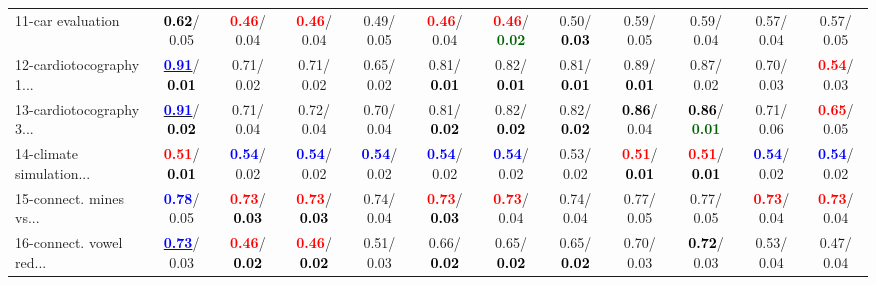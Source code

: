 \begin{table}[h]
\begin{center}
{\begin{tabular}{lc|c|c|c|c|c|c|c|c|c|c}
11-car evaluation & \textcolor{black}{\textbf{  0.62}}/  0.05 & \textcolor{red}{\textbf{  0.46}}/  0.04 & \textcolor{red}{\textbf{  0.46}}/  0.04 &   0.49/  0.05 & \textcolor{red}{\textbf{  0.46}}/  0.04 & \textcolor{red}{\textbf{  0.46}}/\textcolor{darkgreen}{\textbf{  0.02}} &   0.50/\textcolor{black}{\textbf{  0.03}} &   0.59/  0.05 &   0.59/  0.04 &   0.57/  0.04 &   0.57/  0.05 \\
12-cardiotocography 1... & \underline{\textcolor{blue}{\textbf{  0.91}}}/\textcolor{black}{\textbf{  0.01}} &   0.71/  0.02 &   0.71/  0.02 &   0.65/  0.02 &   0.81/\textcolor{black}{\textbf{  0.01}} &   0.82/\textcolor{black}{\textbf{  0.01}} &   0.81/\textcolor{black}{\textbf{  0.01}} &   0.89/\textcolor{black}{\textbf{  0.01}} &   0.87/  0.02 &   0.70/  0.03 & \textcolor{red}{\textbf{  0.54}}/  0.03 \\
13-cardiotocography 3... & \underline{\textcolor{blue}{\textbf{  0.91}}}/\textcolor{black}{\textbf{  0.02}} &   0.71/  0.04 &   0.72/  0.04 &   0.70/  0.04 &   0.81/\textcolor{black}{\textbf{  0.02}} &   0.82/\textcolor{black}{\textbf{  0.02}} &   0.82/\textcolor{black}{\textbf{  0.02}} & \textcolor{black}{\textbf{  0.86}}/  0.04 & \textcolor{black}{\textbf{  0.86}}/\textcolor{darkgreen}{\textbf{  0.01}} &   0.71/  0.06 & \textcolor{red}{\textbf{  0.65}}/  0.05 \\
14-climate simulation... & \textcolor{red}{\textbf{  0.51}}/\textcolor{black}{\textbf{  0.01}} & \textcolor{blue}{\textbf{  0.54}}/  0.02 & \textcolor{blue}{\textbf{  0.54}}/  0.02 & \textcolor{blue}{\textbf{  0.54}}/  0.02 & \textcolor{blue}{\textbf{  0.54}}/  0.02 & \textcolor{blue}{\textbf{  0.54}}/  0.02 &   0.53/  0.02 & \textcolor{red}{\textbf{  0.51}}/\textcolor{black}{\textbf{  0.01}} & \textcolor{red}{\textbf{  0.51}}/\textcolor{black}{\textbf{  0.01}} & \textcolor{blue}{\textbf{  0.54}}/  0.02 & \textcolor{blue}{\textbf{  0.54}}/  0.02 \\ \hline
15-connect. mines vs... & \textcolor{blue}{\textbf{  0.78}}/  0.05 & \textcolor{red}{\textbf{  0.73}}/\textcolor{black}{\textbf{  0.03}} & \textcolor{red}{\textbf{  0.73}}/\textcolor{black}{\textbf{  0.03}} &   0.74/  0.04 & \textcolor{red}{\textbf{  0.73}}/\textcolor{black}{\textbf{  0.03}} & \textcolor{red}{\textbf{  0.73}}/  0.04 &   0.74/  0.04 &   0.77/  0.05 &   0.77/  0.05 & \textcolor{red}{\textbf{  0.73}}/  0.04 & \textcolor{red}{\textbf{  0.73}}/  0.04 \\
16-connect. vowel red... & \underline{\textcolor{blue}{\textbf{  0.73}}}/  0.03 & \textcolor{red}{\textbf{  0.46}}/\textcolor{black}{\textbf{  0.02}} & \textcolor{red}{\textbf{  0.46}}/\textcolor{black}{\textbf{  0.02}} &   0.51/  0.03 &   0.66/\textcolor{black}{\textbf{  0.02}} &   0.65/\textcolor{black}{\textbf{  0.02}} &   0.65/\textcolor{black}{\textbf{  0.02}} &   0.70/  0.03 & \textcolor{black}{\textbf{  0.72}}/  0.03 &   0.53/  0.04 &   0.47/  0.04 \\

\end{tabular}}
\end{center}
\end{table}
